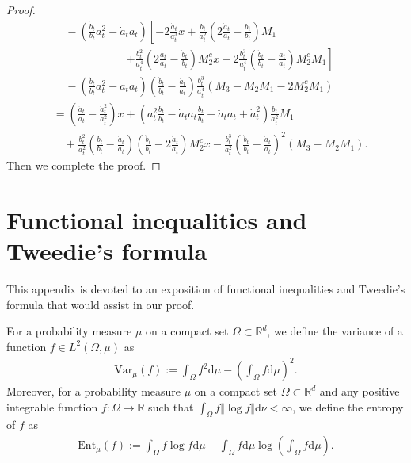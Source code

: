 \documentclass[twoside,11pt]{article}
\def\sR{{\mathbb{R}}}
\newcommand{\diff}{\mathrm{d}}
\numberwithin{equation}{section}
\begin{document}
\begin{proof}
\begin{align*}
    & ~~~~~ - \left( \frac{\dot{b}_t}{b_t} a_t^2 - \dot{a}_t a_t \right)
      \left[ -2 \frac{\dot{a}_t}{a_t^3} x + \frac{b_t}{a_t^2} \left( 2 \frac{\dot{a}_t}{a_t} - \frac{\dot{b}_t}{b_t} \right) M_1 \right. \\
    &~~~~~~~~~~~~~~~~~~~~~~~~~~~~~~ \left. + \frac{b_t^2}{a_t^4} \left( 2 \frac{\dot{a}_t}{a_t} - \frac{\dot{b}_t}{b_t} \right) M^c_2 x
        + 2 \frac{b_t^3}{a_t^4} \left( \frac{\dot{b}_t}{b_t} - \frac{\dot{a}_t}{a_t} \right) M^c_2 M_1 \right] \\
    & ~~~~~ - \left( \frac{\dot{b}_t}{b_t} a_t^2 - \dot{a}_t a_t \right) \left( \frac{\dot{b}_t}{b_t} - \frac{\dot{a}_t}{a_t} \right) \frac{b_t^3}{a_t^4} (M_3 - M_2 M_1 - 2 M^c_2 M_1) \\
    &= \left( \frac{\ddot{a}_t}{a_t} - \frac{\dot{a}_t^2}{a_t^2} \right) x
       + \left( a_t^2 \frac{\ddot{b}_t}{b_t} - \dot{a}_t a_t \frac{\dot{b}_t}{b_t} - \ddot{a}_t a_t + \dot{a}^2_t \right) \frac{b_t}{a_t^2} M_1 \\
    & \quad + \frac{b_t^2}{a_t^2} \left( \frac{\dot{b}_t}{b_t} - \frac{\dot{a}_t}{a_t} \right) \left( \frac{\dot{b}_t}{b_t} - 2 \frac{\dot{a}_t}{a_t} \right) M^c_2 x
      - \frac{b_t^3}{a_t^2} \left( \frac{\dot{b}_t}{b_t} - \frac{\dot{a}_t}{a_t} \right)^2
      \left( M_3 - M_2 M_1 \right).
\end{align*}
Then we complete the proof.
\end{proof}



\section{Functional inequalities and Tweedie’s formula}
This appendix is devoted to an exposition of functional inequalities and Tweedie’s formula that would assist in our proof.

For a probability measure $\mu$ on a compact set $\Omega \subset \sR^d$, we define the variance of a function $f \in L^2(\Omega, \mu)$ as
\begin{align*}
    \mathrm{Var}_{\mu}(f) := \int_{\Omega} f^2 \diff \mu - \left( \int_{\Omega} f \diff \mu \right)^2.
\end{align*}
Moreover, for a probability measure $\mu$ on a compact set $\Omega \subset \sR^d$ and any positive integrable function $f: \Omega \to \sR$ such that $\int_{\Omega} f \Vert \log f \Vert \diff \nu < \infty$, we define the entropy of $f$ as
\begin{align*}
    \mathrm{Ent}_{\mu}(f) := \int_{\Omega} f \log f \diff \mu - \int_{\Omega} f \diff \mu \log \left( \int_{\Omega} f \diff \mu \right).
\end{align*}
\end{document}
